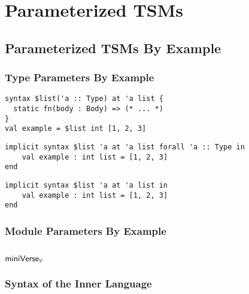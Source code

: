 
\chapter{Parameterized TSMs}\label{chap:ptsms}
\section{Parameterized TSMs By Example}
\subsection{Type Parameters By Example}
\begin{lstlisting}[numbers=none]
syntax $list('a :: Type) at 'a list {
  static fn(body : Body) => (* ... *)
}
val example = $list int [1, 2, 3]

\end{lstlisting}

\begin{lstlisting}[numbers=none]
implicit syntax $list 'a at 'a list forall 'a :: Type in
	val example : int list = [1, 2, 3]
end
\end{lstlisting}
\begin{lstlisting}[numbers=none]
implicit syntax $list 'a at 'a list in
	val example : int list = [1, 2, 3]
end
\end{lstlisting}
\subsection{Module Parameters By Example}
\section{\texorpdfstring{$\mathsf{miniVerse}_\mathbf{\forall}$}{miniVerseForall}}
\subsection{Syntax of the Inner Language}

